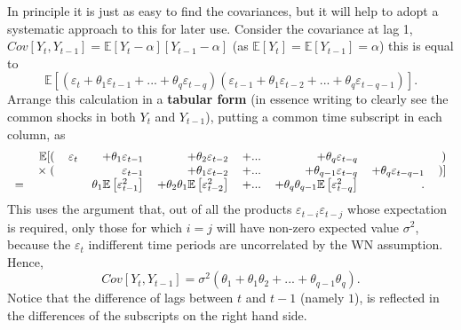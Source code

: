 \documentclass[openany]{tufte-book} %
\begin{document}
\newpage
In principle it is just as easy to find the covariances, but it will help to
adopt a systematic approach to this for later use.
Consider the covariance at lag 1, $Cov\left[ Y_{t},Y_{t-1}\right]
=\mathbb{E}[Y_{t}-\alpha ][Y_{t-1}-\alpha ]$ (as $\mathbb{E}[Y_t]=\mathbb{E}[Y_{t-1}]=\alpha$) this is equal to
\[
\mathbb{E}\left[ (\varepsilon_{t}+\theta_{1}\varepsilon_{t-1}+...+\theta_{q}\varepsilon_{t-q})(\varepsilon_{t-1}+\theta_{1}\varepsilon_{t-2}+...+\theta_{q}\varepsilon_{t-q-1})\right] .
\]%
Arrange this calculation in a \textbf{tabular form} (in essence writing to clearly see the common shocks in both $Y_t$ and $Y_{t-1}$), putting a common time subscript
in each column, as
\begin{equation*}
\begin{tabular}{rrrrrrrrr}
& $\mathbb{E}[($ & $\varepsilon_{t}$ & $+\theta_{1}\varepsilon_{t-1}$ & $+\theta_{2}\varepsilon_{t-2}$ & $+...$ & $+\theta_{q}\varepsilon_{t-q}$ &  & $)$
\\
& $\times \;($ &  & $\varepsilon_{t-1}$ & $+\theta_{1}\varepsilon_{t-2}$
& $+...$ & $+\theta _{q-1}\varepsilon_{t-q}$ & $+\theta_{q}\varepsilon_{t-q-1}$ & $)]$ \\
$=$ &  &  & $\theta_{1}\mathbb{E}\left[ \varepsilon_{t-1}^{2}\right] $ & $+\theta_{2}\theta_{1}\mathbb{E}\left[ \varepsilon_{t-2}^{2}\right] $ & $+...$ & $+\theta_{q}\theta_{q-1}\mathbb{E}\left[ \varepsilon_{t-q}^{2}\right] $ & $.$ &
\end{tabular}%
\end{equation*}
This uses the argument that, out of all the products $\varepsilon_{t-i}\varepsilon_{t-j}$ whose expectation is required, only those for
which $i=j$ will have non-zero expected value $\sigma^{2}$, because the $%
\varepsilon_{t}$ indifferent time periods are uncorrelated by the WN assumption. Hence,
\begin{equation*}
Cov\left[ Y_{t},Y_{t-1}\right] =\sigma^{2}\left( \theta_{1}+\theta_{1}\theta_{2}+...+\theta_{q-1}\theta_{q}\right) .
\end{equation*}
Notice that the difference of lags between $t$ and $t-1$ (namely $1$), is
reflected in the differences of the subscripts on the right hand side.
\end{document}
